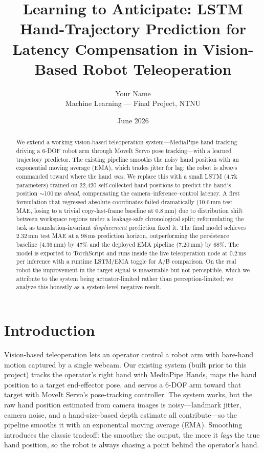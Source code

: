 \documentclass[11pt,a4paper]{article}
\title{Learning to Anticipate: LSTM Hand-Trajectory Prediction for
       Latency Compensation in Vision-Based Robot Teleoperation}
\author{Your Name\\ \small Machine Learning --- Final Project, NTNU}
\date{June 2026}
\begin{document}
\maketitle

\begin{abstract}
We extend a working vision-based teleoperation system---MediaPipe hand tracking
driving a 6-DOF robot arm through MoveIt Servo pose tracking---with a learned
trajectory predictor. The existing pipeline smooths the noisy hand position with
an exponential moving average (EMA), which trades jitter for lag: the robot is
always commanded toward where the hand \emph{was}. We replace this with a small
LSTM (4.7k parameters) trained on 22{,}420 self-collected hand positions to
predict the hand's position $\sim$100\,ms \emph{ahead}, compensating the
camera--inference--control latency. A first formulation that regressed absolute
coordinates failed dramatically (10.6\,mm test MAE, losing to a trivial
copy-last-frame baseline at 0.8\,mm) due to distribution shift between
workspace regions under a leakage-safe chronological split; reformulating the
task as translation-invariant \emph{displacement} prediction fixed it. The
final model achieves 2.32\,mm test MAE at a 98\,ms prediction horizon,
outperforming the persistence baseline (4.36\,mm) by 47\% and the deployed EMA
pipeline (7.20\,mm) by 68\%. The model is exported to TorchScript and runs
inside the live teleoperation node at 0.2\,ms per inference with a runtime
LSTM/EMA toggle for A/B comparison. On the real robot the improvement in the
target signal is measurable but not perceptible, which we attribute to the
system being actuator-limited rather than perception-limited; we analyze this
honestly as a system-level negative result.
\end{abstract}

\section{Introduction}

Vision-based teleoperation lets an operator control a robot arm with bare-hand
motion captured by a single webcam. Our existing system (built prior to this
project) tracks the operator's right hand with MediaPipe Hands, maps the hand
position to a target end-effector pose, and servos a 6-DOF arm toward that
target with MoveIt Servo's pose-tracking controller. The system works, but the
raw hand position estimated from camera images is noisy---landmark jitter,
camera noise, and a hand-size-based depth estimate all contribute---so the
pipeline smooths it with an exponential moving average (EMA). Smoothing
introduces the classic tradeoff: the smoother the output, the more it
\emph{lags} the true hand position, so the robot is always chasing a point
behind the operator's hand.
\end{document}

